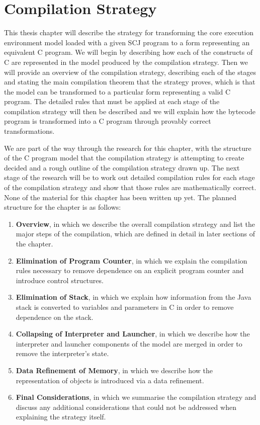 \documentclass[a4paper,10pt]{report}
\let\olditem\item
\renewcommand{\item}[1][]{\olditem{\bfseries #1}}
\begin{document}
\section{Compilation Strategy}

This thesis chapter will describe the strategy for transforming the
core execution environment model loaded with a given SCJ program to a
form representing an equivalent C program.
We will begin by describing how each of the constructs of C are
represented in the \Circus{} model produced by the compilation
strategy.
Then we will provide an overview of the compilation strategy,
describing each of the stages and stating the main compilation theorem
that the strategy proves, which is that the model can be transformed
to a particular form representing a valid C program.
The detailed rules that must be applied at each stage of the
compilation strategy will then be described and we will explain how
the bytecode program is transformed into a C program through provably
correct transformations.

We are part of the way through the research for this chapter, with the
structure of the C program model that the compilation strategy is
attempting to create decided and a rough outline of the compilation
strategy drawn up.
The next stage of the research will be to work out detailed
compilation rules for each stage of the compilation strategy and show
that those rules are mathematically correct.
None of the material for this chapter has been written up yet.
The planned structure for the chapter is as follows:
\begin{enumerate}
\item[Overview], in which we describe the overall compilation strategy
  and list the major steps of the compilation, which are defined in
  detail in later sections of the chapter.
\item[Elimination of Program Counter], in which we explain the
  compilation rules necessary to remove dependence on an explicit
  program counter and introduce control structures.
\item[Elimination of Stack], in which we explain how information from
  the Java stack is converted to variables and parameters in C in
  order to remove dependence on the stack.
\item[Collapsing of Interpreter and Launcher], in which we describe
  how the interpreter and launcher components of the model are merged
  in order to remove the interpreter's state.
\item[Data Refinement of Memory], in which we describe how the
  representation of objects is introduced via a data refinement.
\item[Final Considerations], in which we summarise the compilation
  strategy and discuss any additional considerations that could not be
  addressed when explaining the strategy itself.
\end{enumerate}
\end{document}
